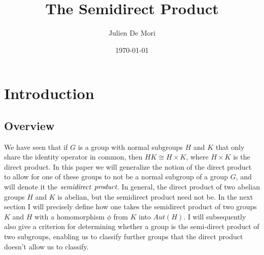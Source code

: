 \documentclass[11pt]{article}
\title{The Semidirect Product}
\author{Julien De Mori}
\date{\today}
\begin{document}
\maketitle

\section{Introduction}
\subsection{Overview}
We have seen that if $G$ is a group with normal subgroups $H$ and $K$ that only share the identity operator in common, then $HK \cong H \times K$, where $H \times K$ is the direct product. In this paper we will generalize the notion of the direct product to allow for one of these groups to not be a normal subgroup of a group $G$, and will denote it the $\emph{semidirect}$ $\emph{product}$. In general, the direct product of two abelian groups $H$ and $K$ is abelian, but the semidirect product need not be. In the next section I will precisely define how one takes the semidirect product of two groups $K$ and $H$ with a homomorphism $\phi$ from $K$ into $Aut(H)$. I will subsequently also give a criterion for determining whether a group is the semi-direct product of two subgroups, enabling us to classify further groups that the direct product doesn't allow us to classify.
\end{document}
